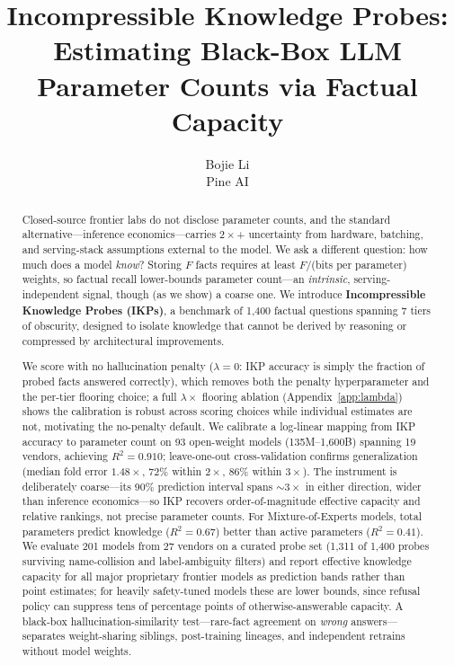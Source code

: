 \documentclass[11pt]{article}
\title{\textbf{Incompressible Knowledge Probes: Estimating Black-Box LLM Parameter Counts via Factual Capacity}}
\author{
  Bojie Li \\[6pt]
  Pine AI
}
\date{}
\begin{document}
\maketitle

\begin{abstract}
Closed-source frontier labs do not disclose parameter counts, and the standard alternative---inference economics---carries $2\times$+ uncertainty from hardware, batching, and serving-stack assumptions external to the model. We ask a different question: how much does a model \emph{know}? Storing $F$ facts requires at least $F/$(bits per parameter) weights, so factual recall lower-bounds parameter count---an \emph{intrinsic}, serving-independent signal, though (as we show) a coarse one. We introduce \textbf{Incompressible Knowledge Probes (IKPs)}, a benchmark of 1{,}400 factual questions spanning 7 tiers of obscurity, designed to isolate knowledge that cannot be derived by reasoning or compressed by architectural improvements.

We score with no hallucination penalty ($\lambda = 0$: IKP accuracy is simply the fraction of probed facts answered correctly), which removes both the penalty hyperparameter and the per-tier flooring choice; a full $\lambda \times$ flooring ablation (Appendix~\ref{app:lambda}) shows the calibration is robust across scoring choices while individual estimates are not, motivating the no-penalty default. We calibrate a log-linear mapping from IKP accuracy to parameter count on 93 open-weight models (135M--1{,}600B) spanning 19 vendors, achieving $R^2 = 0.910$; leave-one-out cross-validation confirms generalization (median fold error $1.48\times$, $72\%$ within $2\times$, $86\%$ within $3\times$). The instrument is deliberately coarse---its 90\% prediction interval spans ${\sim}3\times$ in either direction, wider than inference economics---so IKP recovers order-of-magnitude effective capacity and relative rankings, not precise parameter counts. For Mixture-of-Experts models, total parameters predict knowledge ($R^2 = 0.67$) better than active parameters ($R^2 = 0.41$). We evaluate 201 models from 27 vendors on a curated probe set (1{,}311 of 1{,}400 probes surviving name-collision and label-ambiguity filters) and report effective knowledge capacity for all major proprietary frontier models as prediction bands rather than point estimates; for heavily safety-tuned models these are lower bounds, since refusal policy can suppress tens of percentage points of otherwise-answerable capacity. A black-box hallucination-similarity test---rare-fact agreement on \emph{wrong} answers---separates weight-sharing siblings, post-training lineages, and independent retrains without model weights.


\end{abstract}
\end{document}
